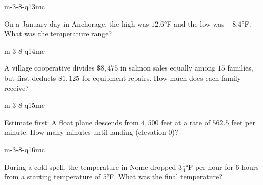 \begin{practiceQuestion}{m-3-8-q13}{mc}
\begin{questionText}
On a January day in Anchorage, the high was $12.6°$F and the low was $-8.4°$F. What was the temperature range?
\end{questionText}
\end{practiceQuestion}

\begin{practiceQuestion}{m-3-8-q14}{mc}
\begin{questionText}
A village cooperative divides $\$8{,}475$ in salmon sales equally among $15$ families, but first deducts $\$1{,}125$ for equipment repairs. How much does each family receive?
\end{questionText}
\end{practiceQuestion}

\begin{practiceQuestion}{m-3-8-q15}{mc}
\begin{questionText}
Estimate first: A float plane descends from $4{,}500$ feet at a rate of $562.5$ feet per minute. How many minutes until landing (elevation $0$)?
\end{questionText}
\end{practiceQuestion}

\begin{practiceQuestion}{m-3-8-q16}{mc}
\begin{questionText}
During a cold spell, the temperature in Nome dropped $3\frac{1}{4}°$F per hour for $6$ hours from a starting temperature of $5°$F. What was the final temperature?
\end{questionText}
\end{practiceQuestion}

